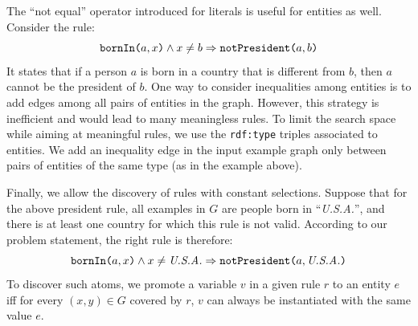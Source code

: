 \noindent {}
The ``not equal'' operator introduced for literals is useful for entities as well. 
Consider the rule:
$$ \texttt{bornIn(}a,x\texttt{)} \wedge x \neq b \Rightarrow \texttt{notPresident(}a,b\texttt{)} $$
It states that if a person $a$ is born in a country that is different from $b$, then $a$ cannot be the president of $b$.
One way to consider inequalities among entities is to add edges among all pairs of entities in the graph. However, this strategy is inefficient and would lead to many meaningless rules. To limit the search space while aiming at meaningful rules, we use the \texttt{rdf:type} triples associated to entities. We add an inequality edge in the input example graph only between pairs of entities of the same type (as in the example above). %

\noindent {}
Finally, we allow the discovery of rules with constant selections. %
Suppose that for the above president rule, all examples in $G$ are people born in ``\textit{U.S.A.}'', and there is at least one country for which this rule is not valid. 
According to our problem statement, the right rule is therefore:
%
$$ \texttt{bornIn(}a,x\texttt{)} \wedge x \neq \emph{U.S.A.} \Rightarrow \texttt{notPresident(}a,\emph{U.S.A.}\texttt{)} $$
%
To discover such atoms, %
we promote a variable $v$ in a given rule $r$ to an entity $e$ iff for every $(x,y) \in G$ covered by $r$, $v$ can always be instantiated with the same value $e$. 

\vspace{-1ex}
